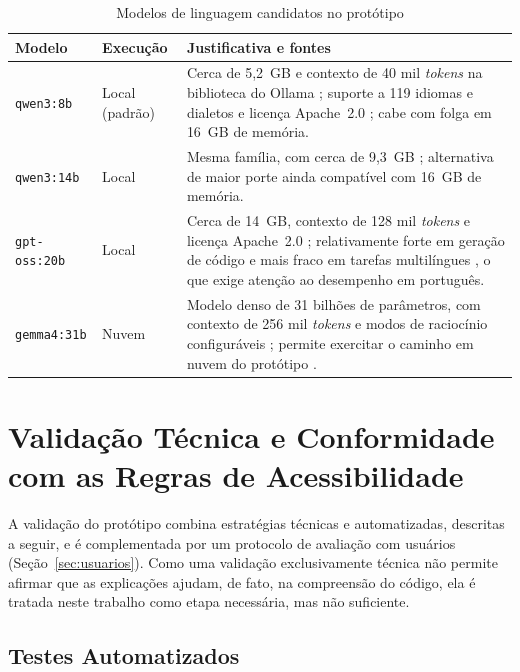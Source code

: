 \documentclass[
    12pt,                   %
    openright,              %
    oneside,                %
    a4paper,                %
    sumario=tradicional,    %
    english,                %
    brazil,                 %
    ]{abntex2}
\begin{document}
\begin{table}[htbp]
  \centering
  \caption{Modelos de linguagem candidatos no protótipo}
  \label{tab:modelos}
  \begin{tabular}{p{2.5cm}p{2.2cm}p{7.6cm}}
    \toprule
    \textbf{Modelo} & \textbf{Execução} & \textbf{Justificativa e fontes} \\
    \midrule
    \texttt{qwen3:8b} & Local (padrão) & Cerca de 5,2~GB e contexto de 40 mil \textit{tokens} na biblioteca do Ollama \cite{ollama2026qwen3}; suporte a 119 idiomas e dialetos e licença Apache~2.0 \cite{yang2025qwen3}; cabe com folga em 16~GB de memória. \\
    \texttt{qwen3:14b} & Local & Mesma família, com cerca de 9,3~GB \cite{ollama2026qwen3}; alternativa de maior porte ainda compatível com 16~GB de memória. \\
    \texttt{gpt-oss:20b} & Local & Cerca de 14~GB, contexto de 128 mil \textit{tokens} e licença Apache~2.0 \cite{ollama2026gptoss}; relativamente forte em geração de código e mais fraco em tarefas multilíngues \cite{bi2025gptoss}, o que exige atenção ao desempenho em português. \\
    \texttt{gemma4:31b} & Nuvem & Modelo denso de 31 bilhões de parâmetros, com contexto de 256 mil \textit{tokens} e modos de raciocínio configuráveis \cite{ollama2026gemma4}; permite exercitar o caminho em nuvem do protótipo \cite{ollama2026nuvem}. \\
    \bottomrule
  \end{tabular}
\end{table}

\section{Validação Técnica e Conformidade com as Regras de Acessibilidade}\label{sec:validacao}

A validação do protótipo combina estratégias técnicas e automatizadas, descritas a seguir, e é complementada por um protocolo de avaliação com usuários (Seção~\ref{sec:usuarios}). Como uma validação exclusivamente técnica não permite afirmar que as explicações ajudam, de fato, na compreensão do código, ela é tratada neste trabalho como etapa necessária, mas não suficiente.

\subsection{Testes Automatizados}
\end{document}
